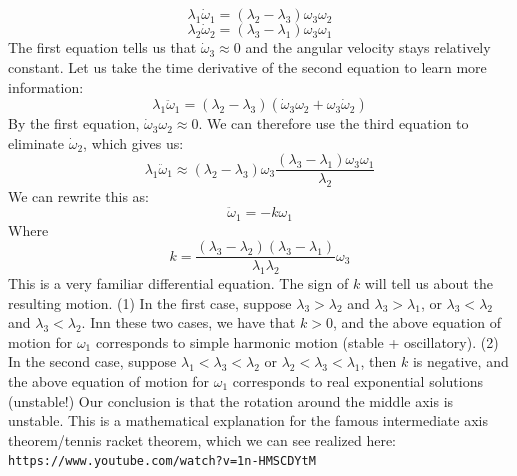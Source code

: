 \documentclass[../PHYS306Notes.tex]{subfiles}
\begin{document}
\[\lambda_1\dot{\omega}_1 = (\lambda_2 - \lambda_3)\omega_3\omega_2\]
\[\lambda_2\dot{\omega}_2 = (\lambda_3 - \lambda_1)\omega_3\omega_1\]
The first equation tells us that $\dot{\omega}_3 \approx 0$ and the angular velocity stays relatively constant. Let us take the time derivative of the second equation to learn more information:
\[\lambda_1\ddot{\omega}_1 = (\lambda_2 - \lambda_3)(\dot{\omega}_3\omega_2 + \omega_3\dot{\omega}_2)\]
By the first equation, $\dot{\omega}_3\omega_2 \approx 0$. We can therefore use the third equation to eliminate $\dot{\omega}_2$, which gives us:
\[\lambda_1 \ddot{\omega}_1 \approx (\lambda_2 - \lambda_3)\omega_3\frac{(\lambda_3 - \lambda_1)\omega_3\omega_1}{\lambda_2}\]
We can rewrite this as:
\[\ddot{\omega}_1 = -k\omega_1\]
Where
\[k = \frac{(\lambda_3 - \lambda_2)(\lambda_3 - \lambda_1)}{\lambda_1\lambda_2}\omega_3\]
This is a very familiar differential equation. The sign of $k$ will tell us about the resulting motion.
\newline (1) In the first case, suppose $\lambda_3 > \lambda_2$ and $\lambda_3 > \lambda_1$, or $\lambda_3 < \lambda_2$ and $\lambda_3 < \lambda_2$. Inn these two cases, we have that $k > 0$, and the above equation of motion for $\omega_1$ corresponds to simple harmonic motion (stable + oscillatory). 
\newline (2) In the second case, suppose $\lambda_1 < \lambda_3 < \lambda_2$ or $\lambda_2 < \lambda_3 < \lambda_1$, then $k$ is negative, and the above equation of motion for $\omega_1$ corresponds to real exponential solutions (unstable!)
\newline Our conclusion is that the rotation around the middle axis is unstable. This is a mathematical explanation for the famous intermediate axis theorem/tennis racket theorem, which we can see realized here: \\ \texttt{https://www.youtube.com/watch?v=1n-HMSCDYtM}
\end{document}

